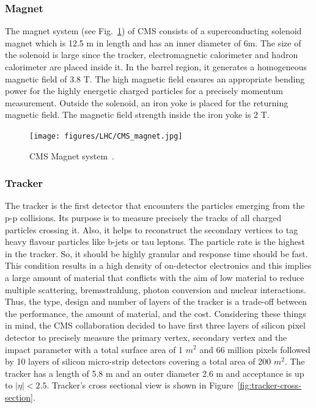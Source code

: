 {{{\subsubsection{Magnet} %
\label{ssub:magnet}
The magnet system (see Fig.~\ref{fig:CMS-magnet}) of CMS consists of a superconducting solenoid magnet which is 12.5 m in length and has an inner diameter of 6m. The size of the solenoid is large since the tracker, electromagnetic calorimeter and hadron calorimeter are placed inside it. In the barrel region, it generates a homogeneous magnetic field of 3.8 T. The high magnetic field ensures an appropriate bending power for the highly energetic charged particles for a precisely momentum measurement. Outside the solenoid, an iron yoke is placed for the returning magnetic field. The magnetic field strength inside the iron yoke is 2 T.
\begin{figure}[!htbp]
	\centering
	\texttt{[image: figures/LHC/CMS\_magnet.jpg]}
	\caption{CMS Magnet system~\cite{Brice2007}.}
	\label{fig:CMS-magnet}
\end{figure}

\subsubsection{Tracker} %
\label{ssub:tracker}
The tracker is the first detector that encounters the particles emerging from the p-p collisions. Its purpose is to measure precisely the tracks of all charged particles crossing it. Also, it helps to reconstruct the secondary vertices to tag heavy flavour particles like b-jets or tau leptons. The particle rate is the highest in the tracker. So, it should be highly granular and response time should be fast. This condition results in a high density of on-detector electronics and this implies a large amount of material that conflicts with the aim of low material to reduce multiple scattering, bremsstrahlung, photon conversion and nuclear interactions. Thus, the type, design and number of layers of the tracker is a trade-off between the performance, the amount of material, and the cost. Considering these things in mind, the CMS collaboration decided to have first three layers of silicon pixel detector to precisely measure the primary vertex, secondary vertex and the impact parameter with a total surface area of 1 $m^2$ and 66 million pixels followed by 10 layers of  silicon micro-strip detectors covering a total area of 200 $m^2$. The tracker has a length of 5.8 m and an outer diameter 2.6 m and acceptance is up to $|\eta|<2.5$. Tracker's cross sectional view is shown in Figure~\ref{fig:tracker-cross-section}.

}}}
